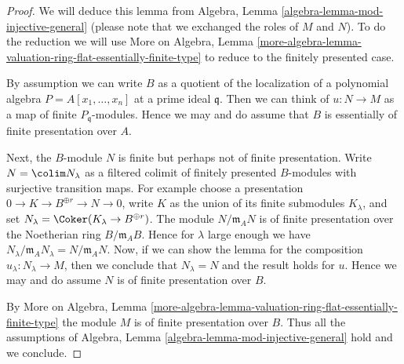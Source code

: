\begin{proof}
We will deduce this lemma from
Algebra, Lemma \ref{algebra-lemma-mod-injective-general}
(please note that we exchanged the roles of $M$ and $N$).
To do the reduction we will use More on Algebra, Lemma
\ref{more-algebra-lemma-valuation-ring-flat-essentially-finite-type}
to reduce to the finitely presented case.

\medskip\noindent
By assumption we can write $B$ as a quotient of the localization of
a polynomial algebra $P = A[x_1, \ldots, x_n]$ at a prime ideal
$\mathfrak q$. Then we can think of $u : N \to M$ as a map
of finite $P_\mathfrak q$-modules. Hence we may and do assume that
$B$ is essentially of finite presentation over $A$.

\medskip\noindent
Next, the $B$-module $N$ is finite but perhaps not of finite presentation.
Write $N = \colim N_\lambda$ as a filtered colimit of finitely presented
$B$-modules with surjective transition maps. For example choose
a presentation $0 \to K \to B^{\oplus r} \to N \to 0$,
write $K$ as the union of its finite submodules $K_\lambda$, and
set $N_\lambda = \Coker(K_\lambda \to B^{\oplus r})$.
The module $N/\mathfrak m_A N$ is of finite presentation
over the Noetherian ring $B/\mathfrak m_A B$.
Hence for $\lambda$ large enough we have
$N_\lambda/\mathfrak m_A N_\lambda = N/\mathfrak m_A N$.
Now, if we can show the lemma for the composition
$u_\lambda : N_\lambda \to M$, then we conclude that
$N_\lambda = N$ and the result holds for $u$.
Hence we may and do assume $N$ is of finite presentation over $B$.

\medskip\noindent
By More on Algebra, Lemma
\ref{more-algebra-lemma-valuation-ring-flat-essentially-finite-type}
the module $M$ is of finite presentation over $B$.
Thus all the assumptions of
Algebra, Lemma \ref{algebra-lemma-mod-injective-general}
hold and we conclude.
\end{proof}

